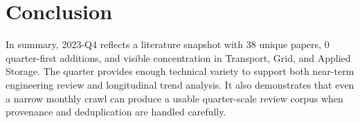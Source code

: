\documentclass[conference]{IEEEtran}
\begin{document}
\section{Conclusion}
In summary, 2023-Q4 reflects a literature snapshot with 38 unique papers, 0 quarter-first additions, and visible concentration in Transport, Grid, and Applied Storage. The quarter provides enough technical variety to support both near-term engineering review and longitudinal trend analysis. It also demonstrates that even a narrow monthly crawl can produce a usable quarter-scale review corpus when provenance and deduplication are handled carefully.



\end{document}
